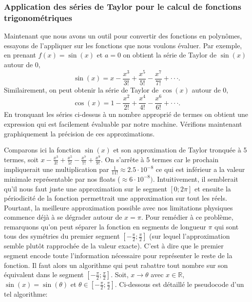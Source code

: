 \documentclass{article}
\begin{document}
\subsubsection{Application des séries de Taylor pour le calcul de fonctions trigonométriques}
Maintenant que nous avons un outil pour convertir des fonctions en polynômes, essayons de l'appliquer sur les fonctions que nous voulons évaluer.
Par exemple, en prenant $f(x) = \sin(x)$ et $a = 0$ on obtient la série de Taylor de $\sin(x)$ autour de 0, 
$$\sin(x) = x - \frac{x^3}{3!} + \frac{x^5}{5!} - \frac{x^7}{7!} + \cdot\cdot\cdot.$$
Similairement, on peut obtenir la série de Taylor de $\cos(x)$ autour de 0,
$$\cos(x) = 1 - \frac{x^2}{2!} + \frac{x^4}{4!} - \frac{x^6}{6!} + \cdot\cdot\cdot.$$
En tronquant les séries ci-dessus à un nombre approprié de termes on obtient une expression qui est facilement évaluable par notre machine.
Vérifions maintenant graphiquement la précision de ces approximations.
\begin{center}
\end{center}
Comparons ici la fonction $\sin(x)$ et son approximation de Taylor tronquée à 5 termes, soit $x-\frac{x^3}{3!}+\frac{x^5}{5!}-\frac{x^7}{7!}+\frac{x^9}{9!}$. On s'arrête à 5 termes car le prochain impliquerait une multiplication par $\frac{1}{11!} \approx 2.5 \cdot 10^{-8}$ ce qui est inférieur a la valeur minimale représentable par nos floats ($\approx 6 \cdot 10^{-8})$. Intuitivement, il semblerait qu'il nous faut juste une approximation sur le segment $[0; 2\pi]$ et ensuite la périodicité de la fonction permettrait une approximation sur tout les réels. Pourtant, la meilleure approximation possible avec nos limitations physiques commence déjà à se dégrader autour de $x = \pi$. Pour remédier à ce problème, remarquons qu'on peut séparer la fonction en segments de longueur $\pi$ qui sont tous des symétries du premier segment $[-\frac{\pi}{2}; \frac{\pi}{2}]$ (sur lequel l'approximation semble plutôt rapprochée de la valeur exacte). C'est à dire que le premier segment encode toute l'information nécessaire pour représenter le reste de la fonction. Il faut alors un algorithme qui peut rabattre tout nombre sur son équivalent dans le segment $[-\frac{\pi}{2}; \frac{\pi}{2}]$. Soit, $x\rightarrow \theta$ avec $x \in \mathbb{R}$, $\sin(x) = \sin(\theta)$ et $\theta \in [-\frac{\pi}{2}; \frac{\pi}{2}]$. Ci-dessous est détaillé le pseudocode d'un tel algorithme:
\end{document}
